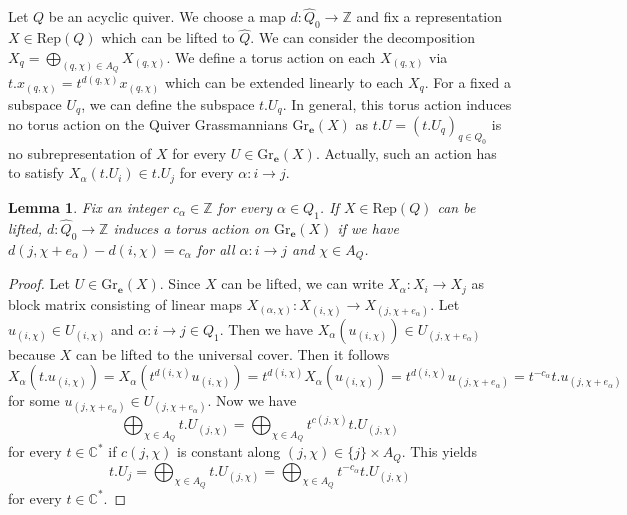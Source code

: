 \documentclass{amsart}
\newtheorem{lemma}[theorem]{Lemma}
\newcommand{\bfe}{\mathbf{e}}
\newcommand{\C}{\mathbb{C}}
\newcommand{\Rep}{\mathrm{Rep}}
\newcommand{\Gr}{\mathrm{Gr}}
\newcommand{\ZZ}{\mathbb{Z}}
\begin{document}
Let $Q$ be an acyclic quiver. We choose a map $d:\hat Q_0\to\ZZ$ and fix a representation $X\in\Rep(Q)$ which can be lifted to $\hat Q$. We can consider the decomposition $X_q=\bigoplus_{(q,\chi)\in A_Q} X_{(q,\chi)}$. We define a torus action on each $X_{(q,\chi)}$ via $t.x_{(q,\chi)}=t^{d(q,\chi)}x_{(q,\chi)}$ which can be extended linearly to each $X_q$. For a fixed a subspace $U_q$, we can define the subspace $t.U_q$. In general, this torus action induces no torus action on the Quiver Grassmannians $\Gr_{\bfe}(X)$ as $t.U=(t.U_q)_{q\in Q_0}$ is no subrepresentation of $X$ for every $U\in \Gr_{\bfe}(X)$. Actually, such an action has to satisfy $X_{\alpha}(t.U_i)\in t.U_j$ for every $\alpha:i\to j$. 
\begin{lemma}Fix an integer $c_\alpha\in\ZZ$ for every $\alpha\in Q_1$.
If $X\in\Rep(Q)$ can be lifted, $d:\hat Q_0\to\ZZ$ induces a torus action on $\Gr_\bfe(X)$ if we have $d(j,\chi+e_\alpha)-d(i,\chi)=c_\alpha$ for all $\alpha:i\to j$ and $\chi\in A_{Q}$.
\end{lemma}
\begin{proof} Let $U\in \Gr_\bfe(X)$. Since $X$ can be lifted, we can write $X_\alpha:X_i\to X_j$ as block matrix consisting of linear maps $X_{(\alpha,\chi)}:X_{(i,\chi)}\to X_{(j,\chi+e_\alpha)}$. Let $u_{(i,\chi)}\in U_{(i,\chi)}$ and $\alpha:i\to j\in Q_1$. Then we have $X_\alpha(u_{(i,\chi)})\in U_{(j,\chi+e_\alpha)}$ because $X$ can be lifted to the universal cover. Then it follows
\[X_\alpha(t.u_{(i,\chi)})=X_\alpha(t^{d(i,\chi)}u_{(i,\chi)})=t^{d(i,\chi)}X_\alpha(u_{(i,\chi)})=t^{d(i,\chi)}u_{(j,\chi+e_\alpha)}=t^{-c_\alpha}t.u_{(j,\chi+e_\alpha)}\]
for some $u_{(j,\chi+e_\alpha)}\in U_{(j,\chi+e_\alpha)}$.
Now we have \[\bigoplus_{\chi\in A_Q} t.U_{(j,\chi)}=\bigoplus_{\chi\in A_Q}t^{c(j,\chi)}t.U_{(j,\chi)}\]
for every $t\in\C^\ast$ if $c(j,\chi)$ is constant along $(j,\chi)\in \{j\}\times A_Q$. This yields  
\[t.U_j=\bigoplus_{\chi\in A_Q} t.U_{(j,\chi)}=\bigoplus_{\chi\in A_Q}t^{-c_\alpha}t.U_{(j,\chi)}\]
for every $t\in \C^\ast$.
\end{proof}
\end{document}
